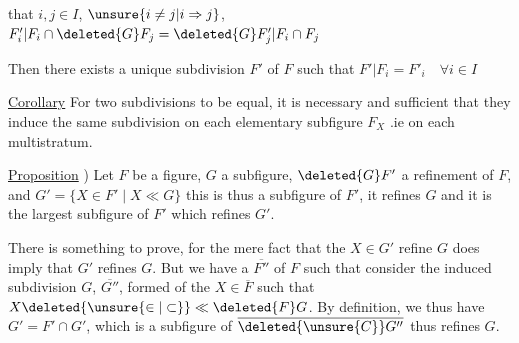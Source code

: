 
that  $i,j\in I$, $\unsure{i\ne j|i\Rightarrow j}$, $F'_i|F_i\cap\deleted{G}F_j=\deleted{G}F'_j|F_i\cap F_j$

Then there exists a unique subdivision $F'$ of $F$ such that $F'|F_i=F'_i\quad\forall i\in I$

\uline{Corollary} For two subdivisions  to be equal, it is necessary and sufficient that they induce the same subdivision on each elementary subfigure $F_X$ .ie on each multistratum.

 \uline{Proposition} ) Let $F$ be a figure, $G$ a subfigure, $\deleted{G}F'$ a refinement of $F$, and $G'=\{X\in F'\mid X\ll G\}$ this is thus a subfigure of $F'$,  it refines $G$ and it is  the largest subfigure of $F'$ which refines $G'$.



 There is something to prove, for the mere fact that the $X\in G'$ refine $G$ does  imply that $G'$ refines $G$. But we have a   $\overline{F''}$ of $F$ such that  consider the induced subdivision  $G$, $\overline{G''}$, formed of the $X\in\overline{F}$ such that $X\deleted{\unsure{\in|\subset}}\ll \deleted{F}G$.  By definition, we thus have $G'=F'\cap G'$, which is  a subfigure of $\overline{\deleted{\unsure{C}}G''}$ thus refines $G$.
